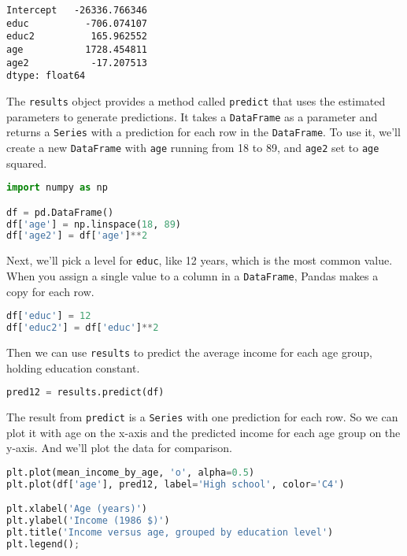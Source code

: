 \begin{lstlisting}[style=output]
Intercept   -26336.766346
educ          -706.074107
educ2          165.962552
age           1728.454811
age2           -17.207513
dtype: float64
\end{lstlisting}

The \passthrough{\lstinline!results!} object provides a method called
\passthrough{\lstinline!predict!} that uses the estimated parameters to
generate predictions. It takes a \passthrough{\lstinline!DataFrame!} as
a parameter and returns a \passthrough{\lstinline!Series!} with a
prediction for each row in the \passthrough{\lstinline!DataFrame!}. To
use it, we'll create a new \passthrough{\lstinline!DataFrame!} with
\passthrough{\lstinline!age!} running from 18 to 89, and
\passthrough{\lstinline!age2!} set to \passthrough{\lstinline!age!}
squared.

\begin{lstlisting}[language=Python,style=source]
import numpy as np

df = pd.DataFrame()
df['age'] = np.linspace(18, 89)
df['age2'] = df['age']**2
\end{lstlisting}

Next, we'll pick a level for \passthrough{\lstinline!educ!}, like 12
years, which is the most common value. When you assign a single value to
a column in a \passthrough{\lstinline!DataFrame!}, Pandas makes a copy
for each row.

\begin{lstlisting}[language=Python,style=source]
df['educ'] = 12
df['educ2'] = df['educ']**2
\end{lstlisting}

Then we can use \passthrough{\lstinline!results!} to predict the average
income for each age group, holding education constant.

\begin{lstlisting}[language=Python,style=source]
pred12 = results.predict(df)
\end{lstlisting}

The result from \passthrough{\lstinline!predict!} is a
\passthrough{\lstinline!Series!} with one prediction for each row. So we
can plot it with age on the x-axis and the predicted income for each age
group on the y-axis. And we'll plot the data for comparison.

\pagebreak

\begin{lstlisting}[language=Python,style=source]
plt.plot(mean_income_by_age, 'o', alpha=0.5)
plt.plot(df['age'], pred12, label='High school', color='C4')

plt.xlabel('Age (years)')
plt.ylabel('Income (1986 $)')
plt.title('Income versus age, grouped by education level')
plt.legend();
\end{lstlisting}

